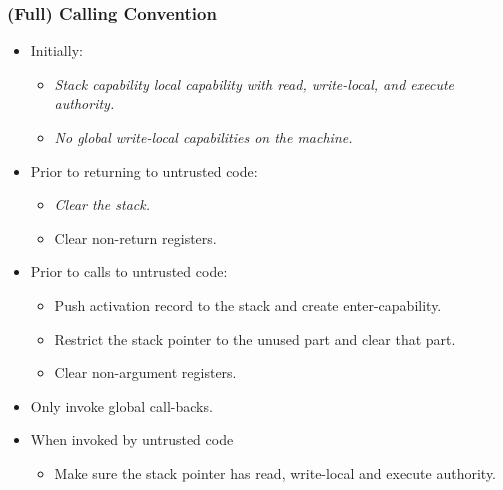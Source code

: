 \documentclass{beamer}
\begin{document}
\begin{frame}
  \frametitle{(Full) Calling Convention}  
  \begin{itemize}
  \item Initially:
    \begin{itemize}
    \item \textit{Stack capability local capability with read, write-local, and execute authority.}
    \item \textit{No global write-local capabilities on the machine.}
    \end{itemize}
  \item Prior to returning to untrusted code:
    \begin{itemize}
    \item \textit{Clear the stack.}
    \item Clear non-return registers.
    \end{itemize}
  \item Prior to calls to untrusted code:
    \begin{itemize}
    \item Push activation record to the stack and create enter-capability.
    \item Restrict the stack pointer to the unused part and clear that part.
    \item Clear non-argument registers.
    \end{itemize}
  \item Only invoke global call-backs.
  \item When invoked by untrusted code
    \begin{itemize}
    \item Make sure the stack pointer has read, write-local and execute authority.
    \end{itemize}
  \end{itemize}
\end{frame}
\end{document}
